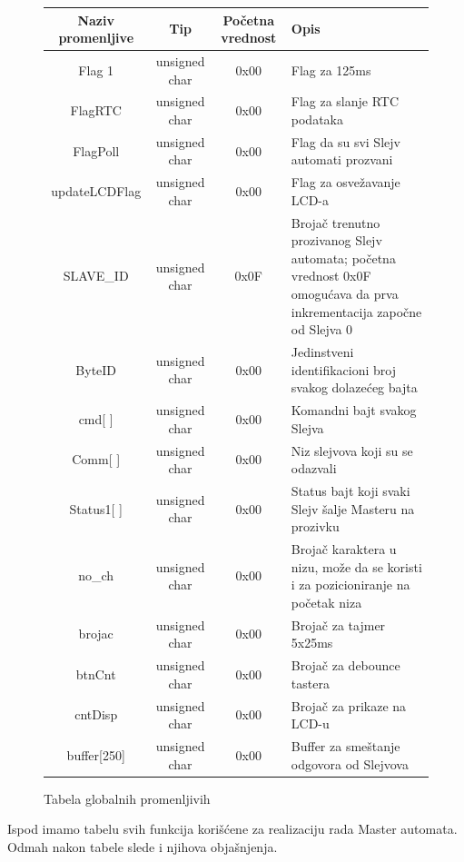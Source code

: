 \documentclass[12pt]{article}
\numberwithin{figure}{section}
\begin{document}
\begin{figure}[ht]
    \caption{Tabela globalnih promenljivih}
    \begin{tabular}{|c|c|c|p{5cm}|}
      \hline
      Naziv promenljive & Tip & Početna vrednost & Opis \\
      \hline
      Flag 1 & unsigned char & 0x00 & Flag za 125ms \\
      \hline
      FlagRTC & unsigned char & 0x00 & Flag za slanje RTC podataka \\
      \hline
      FlagPoll & unsigned char & 0x00 & Flag da su svi Slejv automati prozvani \\
      \hline
      updateLCDFlag & unsigned char & 0x00 & Flag za osvežavanje LCD-a \\
      \hline
      SLAVE\_ID & unsigned char & 0x0F & Brojač trenutno prozivanog Slejv automata; početna vrednost 0x0F omogućava da prva inkrementacija započne od Slejva 0 \\
      \hline
       ByteID & unsigned char & 0x00 & Jedinstveni identifikacioni broj svakog dolazećeg bajta  \\
      \hline 
       cmd[ ] & unsigned char & 0x00 & Komandni bajt svakog Slejva \\ 
      \hline
       Comm[ ] & unsigned char & 0x00 & Niz slejvova koji su se odazvali\\
      \hline
       Status1[ ] & unsigned char & 0x00 & Status bajt koji svaki Slejv šalje Masteru na prozivku \\
      \hline
       no\_ch &  unsigned char  & 0x00 & Brojač karaktera u nizu, može da se koristi i za pozicioniranje na početak niza \\
       \hline
        brojac &  unsigned char  & 0x00 & Brojač za tajmer  5x25ms \\
       \hline
        btnCnt &  unsigned char  & 0x00 & Brojač za debounce tastera \\
       \hline
        cntDisp &  unsigned char  & 0x00 & Brojač za prikaze na LCD-u \\
       \hline
        buffer[250] & unsigned char & 0x00 & Buffer za smeštanje odgovora od Slejvova \\
      \hline
      \end{tabular}
\end{figure}

\clearpage

Ispod imamo tabelu svih funkcija korišćene za realizaciju rada Master automata. Odmah nakon tabele slede i njihova objašnjenja.
\end{document}
